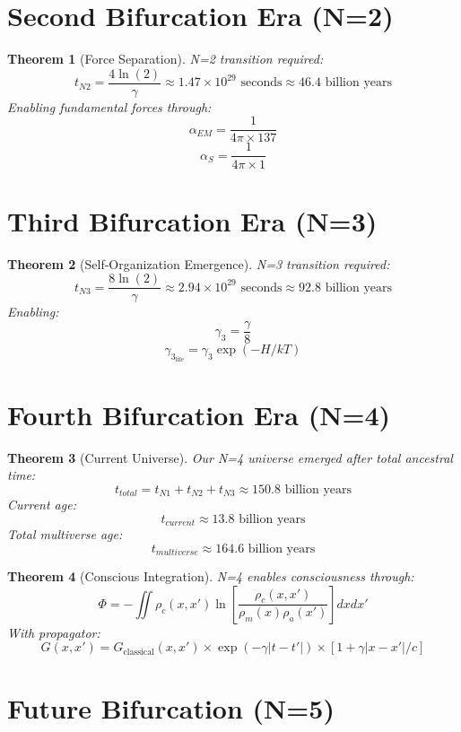 \documentclass{article}
\newtheorem{theorem}{Theorem}
\begin{document}
\section{Second Bifurcation Era (N=2)}

\begin{theorem}[Force Separation]
N=2 transition required:
\[t_{N2} = \frac{4\ln(2)}{\gamma} \approx 1.47 \times 10^{29} \text{ seconds} \approx 46.4 \text{ billion years}\]
Enabling fundamental forces through:
\[\alpha_{EM} = \frac{1}{4\pi \times 137}\]
\[\alpha_S = \frac{1}{4\pi \times 1}\]
\end{theorem}

\section{Third Bifurcation Era (N=3)}

\begin{theorem}[Self-Organization Emergence]
N=3 transition required:
\[t_{N3} = \frac{8\ln(2)}{\gamma} \approx 2.94 \times 10^{29} \text{ seconds} \approx 92.8 \text{ billion years}\]
Enabling:
\[\gamma_3 = \frac{\gamma}{8}\]
\[\gamma_{3_{\text{life}}} = \gamma_3\exp(-H/kT)\]
\end{theorem}

\section{Fourth Bifurcation Era (N=4)}

\begin{theorem}[Current Universe]
Our N=4 universe emerged after total ancestral time:
\[t_{total} = t_{N1} + t_{N2} + t_{N3} \approx 150.8 \text{ billion years}\]
Current age:
\[t_{current} \approx 13.8 \text{ billion years}\]
Total multiverse age:
\[t_{multiverse} \approx 164.6 \text{ billion years}\]
\end{theorem}

\begin{theorem}[Conscious Integration]
N=4 enables consciousness through:
\[\Phi = -\iint\rho_c(x,x')\ln[\frac{\rho_c(x,x')}{\rho_m(x)\rho_a(x')}]dxdx'\]
With propagator:
\[G(x,x') = G_{\text{classical}}(x,x') \times \exp(-\gamma|t-t'|) \times [1 + \gamma|x-x'|/c]\]
\end{theorem}

\section{Future Bifurcation (N=5)}
\end{document}
